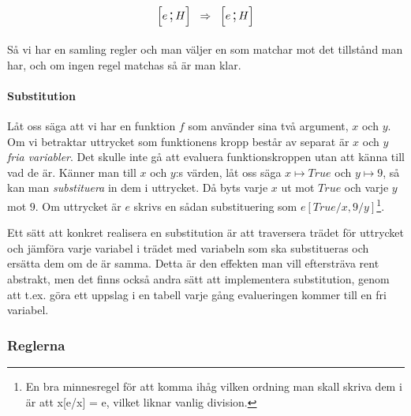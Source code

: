 \documentclass[../Core]{subfiles}
\begin{document}
\begin{equation*}
        \tikz[baseline]{\node[anchor=base] (m1) 
            {\conf{}{$ e \csep H$}};
        } \tikz[baseline]{\node[anchor=base](msep){$\rulesep$};}
        \tikz[baseline]{
            \node[anchor=base] (m2)
            {\conf{}{$ e \csep H$}};
        } 
\end{equation*}



Så vi har en samling regler och man väljer en som matchar mot det tillstånd man har, och om 
ingen regel matchas så är man klar.

\paragraph{Substitution}

Låt oss säga att vi har en funktion $f$ som använder sina två 
argument, $x$ och $y$. Om vi betraktar uttrycket som funktionens 
kropp består av separat är $x$ och $y$ 
\emph{fria variabler}. Det skulle inte gå att evaluera funktionskroppen utan
att känna till vad de är. Känner man till $x$ och $y$:s värden, låt oss säga
$x \mapsto True$ och $y \mapsto 9$, så kan man \emph{substituera} in dem i 
uttrycket. Då byts varje $x$ ut mot $True$ och varje $y$ mot $9$. Om uttrycket 
är $e$ skrivs en sådan substituering som $e[True/x, 9/y]$\footnote{
  En bra minnesregel för att komma ihåg vilken ordning man skall 
  skriva dem i är att x[e/x] = e, vilket liknar vanlig division.}. 

    Ett sätt att konkret realisera en substitution är att traversera trädet
för uttrycket och jämföra varje variabel i trädet med variabeln som ska 
substitueras och ersätta dem om de är samma. Detta är den effekten man vill 
eftersträva rent abstrakt, men det finns också andra sätt att implementera 
substitution, genom att t.ex. göra ett uppslag i en tabell varje gång 
evalueringen kommer till en fri variabel. 

\subsubsection{Reglerna}
\end{document}
